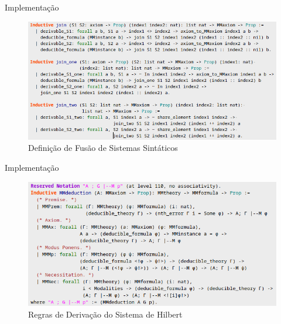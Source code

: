 \documentclass[xcolor=table]{beamer}
\begin{document}
    \begin{frame}{Implementação}
        \begin{adjustwidth}{-.5cm}{}
            \begin{figure}[htbp]
                \centering
                \includegraphics[scale=.45]{FusaoSistemasSintaticos.png}
                \caption{Definição de Fusão de Sistemas Sintáticos}
            \end{figure}
        \end{adjustwidth}
    \end{frame}

    \begin{frame}{Implementação}
        \begin{adjustwidth}{-.9cm}{}
            \begin{figure}[htbp]
                \centering
                \includegraphics[scale=.5]{SistemaHilbert.png}
                \caption{Regras de Derivação do Sistema de Hilbert}
            \end{figure}
        \end{adjustwidth}
    \end{frame}
\end{document}
